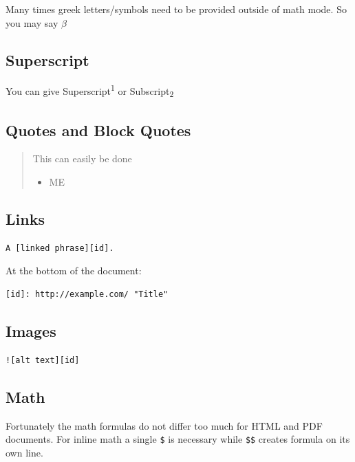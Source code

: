 \documentclass[]{cik}%
\begin{document}
Many times greek letters/symbols need to be provided outside of math
mode. So you may say \(\beta\)

\hypertarget{superscript}{%
\subsection{Superscript}\label{superscript}}

You can give Superscript\textsuperscript{1} or
Subscript\textsubscript{2}

\hypertarget{quotes-and-block-quotes}{%
\subsection{Quotes and Block Quotes}\label{quotes-and-block-quotes}}

\begin{quote}
This can easily be done

\begin{itemize}
\tightlist
\item
  ME
\end{itemize}
\end{quote}

\hypertarget{links}{%
\subsection{Links}\label{links}}

\begin{verbatim}
A [linked phrase][id].
\end{verbatim}

At the bottom of the document:

\begin{verbatim}
[id]: http://example.com/ "Title"
\end{verbatim}

\hypertarget{images}{%
\subsection{Images}\label{images}}

\begin{verbatim}
![alt text][id]
\end{verbatim}

\hypertarget{math}{%
\subsection{Math}\label{math}}

Fortunately the math formulas do not differ too much for HTML and PDF
documents. For inline math a single \texttt{\$} is necessary while
\texttt{\$\$} creates formula on its own line.
\end{document}
